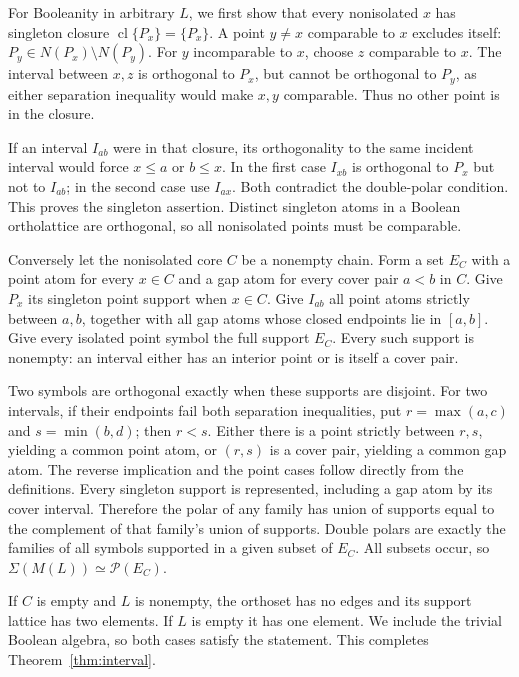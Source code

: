 \documentclass[11pt,a4paper]{article}
\theoremstyle{definition}
\newcommand{\cl}{\operatorname{cl}}
\begin{document}
For Booleanity in arbitrary $L$, we first show that every nonisolated $x$ has singleton closure $\cl\{P_x\}=\{P_x\}$. A point $y\ne x$ comparable to $x$ excludes itself: $P_y\in N(P_x)\setminus N(P_y)$. For $y$ incomparable to $x$, choose $z$ comparable to $x$. The interval between $x,z$ is orthogonal to $P_x$, but cannot be orthogonal to $P_y$, as either separation inequality would make $x,y$ comparable. Thus no other point is in the closure.

If an interval $I_{ab}$ were in that closure, its orthogonality to the same incident interval would force $x\le a$ or $b\le x$. In the first case $I_{xb}$ is orthogonal to $P_x$ but not to $I_{ab}$; in the second case use $I_{ax}$. Both contradict the double-polar condition. This proves the singleton assertion. Distinct singleton atoms in a Boolean ortholattice are orthogonal, so all nonisolated points must be comparable.

Conversely let the nonisolated core $C$ be a nonempty chain. Form a set $E_C$ with a point atom for every $x\in C$ and a gap atom for every cover pair $a<b$ in $C$. Give $P_x$ its singleton point support when $x\in C$. Give $I_{ab}$ all point atoms strictly between $a,b$, together with all gap atoms whose closed endpoints lie in $[a,b]$. Give every isolated point symbol the full support $E_C$. Every such support is nonempty: an interval either has an interior point or is itself a cover pair.

Two symbols are orthogonal exactly when these supports are disjoint. For two intervals, if their endpoints fail both separation inequalities, put $r=\max(a,c)$ and $s=\min(b,d)$; then $r<s$. Either there is a point strictly between $r,s$, yielding a common point atom, or $(r,s)$ is a cover pair, yielding a common gap atom. The reverse implication and the point cases follow directly from the definitions. Every singleton support is represented, including a gap atom by its cover interval. Therefore the polar of any family has union of supports equal to the complement of that family's union of supports. Double polars are exactly the families of all symbols supported in a given subset of $E_C$. All subsets occur, so $\Sigma(M(L))\simeq\mathcal P(E_C)$.

If $C$ is empty and $L$ is nonempty, the orthoset has no edges and its support lattice has two elements. If $L$ is empty it has one element. We include the trivial Boolean algebra, so both cases satisfy the statement. This completes Theorem~\ref{thm:interval}.
\end{document}
